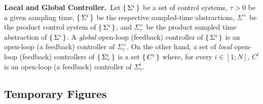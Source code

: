 \smallskip
\noindent\textbf{Local and Global Controller.}\
Let $\set{\Sigma^i} $ be a set of control systems, $\tau >0$ be a given sampling time, $\set{\Sigma^i} $ be the respective sampled-time abstractions, $\Sigma^\times$ be the product control system of $\set{\Sigma^i} $, and $\Sigma^\times_\tau$ be the product sampled time abstraction of $\set{\Sigma^i} $.
A \emph{global} open-loop (feedback) controller of $\set{\Sigma^i} $ is an open-loop (a feedback) controller of $\Sigma_\tau^\times$.
On the other hand, a set of \emph{local} open-loop (feedback) controllers of $\set{\Sigma^i_\tau} $ is a set $\set{C^i} $ where, for every $i\in [1;N]$, $C^i$ is an open-loop (a feedback) controller of $\Sigma^i_\tau$.
\newpage
\subsection{Temporary Figures}

